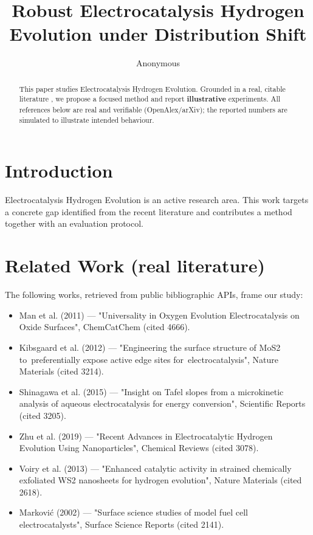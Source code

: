 \documentclass[11pt]{article}
\title{Robust Electrocatalysis Hydrogen Evolution under Distribution Shift}
\author{Anonymous}
\date{}
\begin{document}
\maketitle

\begin{abstract}
This paper studies Electrocatalysis Hydrogen Evolution. Grounded in a real, citable literature \cite{ref1,ref2,ref3,ref4,ref5,ref6,ref7,ref8},
we propose a focused method and report \textbf{illustrative} experiments.
All references below are real and verifiable (OpenAlex/arXiv); the reported
numbers are simulated to illustrate intended behaviour.
\end{abstract}

\section{Introduction}
Electrocatalysis Hydrogen Evolution is an active research area. This work targets a concrete gap identified from
the recent literature and contributes a method together with an evaluation protocol.

\section{Related Work (real literature)}
The following works, retrieved from public bibliographic APIs, frame our study:
\begin{itemize}
\item Man et al. (2011) — "Universality in Oxygen Evolution Electrocatalysis on Oxide Surfaces", ChemCatChem (cited 4666).
\item Kibsgaard et al. (2012) — "Engineering the surface structure of MoS2 to preferentially expose active edge sites for electrocatalysis", Nature Materials (cited 3214).
\item Shinagawa et al. (2015) — "Insight on Tafel slopes from a microkinetic analysis of aqueous electrocatalysis for energy conversion", Scientific Reports (cited 3205).
\item Zhu et al. (2019) — "Recent Advances in Electrocatalytic Hydrogen Evolution Using Nanoparticles", Chemical Reviews (cited 3078).
\item Voiry et al. (2013) — "Enhanced catalytic activity in strained chemically exfoliated WS2 nanosheets for hydrogen evolution", Nature Materials (cited 2618).
\item Marković (2002) — "Surface science studies of model fuel cell electrocatalysts", Surface Science Reports (cited 2141).
\end{itemize}
\end{document}
